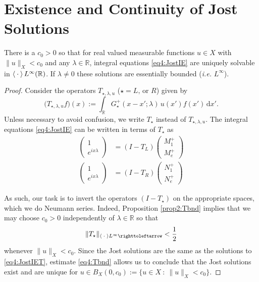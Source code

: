 \documentclass[../dissertation.tex]{subfiles}
\begin{document}
\section{Existence and Continuity of Jost Solutions}\label{sec4:Exist}



\begin{prop}\label{prop4:exist}
	There is a $c_0 > 0$ so that for real valued measurable functions $u \in X$
	with $\| u \|_X < c_0$ and any $\lambda \in \mathbb R$, integral equations 
	\eqref{eq4:JostIE} are uniquely solvable in $\left\langle \kern 0.5ex \cdot \kern 0.5ex \right\rangle L^\infty(\mathbb R)$.
	If $\lambda \ne 0$ these solutions are essentially bounded 
	(\textit{i.e.} $L^\infty$).
\end{prop}
\begin{proof}
	Consider the operators $T_{\star,\lambda, u}$ ($\star = L \text{, or } R$)
	given by
	\[
		\big(T_{\star,\lambda, u} f\big)(x) 
			:= \int_{\mathbb R} G_\star^+(x-x'; \lambda) \, u(x') f(x') \, \mathrm{d}x'.
	\]
	Unless necessary to avoid confusion, we write $T_\star$ instead of 
	$T_{\star,\lambda,u}$. The integral equations \eqref{eq4:JostIE} can be 
	written in terms of $T_\star$ as
	\begin{subequations}
		\label{eq4:JostIET}
		\begin{align}
			\label{eq4:JostIETM}
			\begin{pmatrix}
				1 \\ e^{ix\lambda}
			\end{pmatrix}
			&= 
				(I - T_L) 
				\begin{pmatrix}
					M_1^+ \\
					M_e^+
				\end{pmatrix} \\
			\label{eq4:JostIETN}
			\begin{pmatrix}
				1 \\ e^{ix\lambda}
			\end{pmatrix}
			&= 
				(I - T_R) 
				\begin{pmatrix}
					N_1^+ \\
					N_e^+
				\end{pmatrix}
		\end{align}
	\end{subequations}

	As such, our task is to invert the operators $(I - T_\star)$ on the 
	appropriate spaces, which we do  Neumann series. Indeed, 
	Proposition \ref{prop2:Tbnd} implies that we may choose $c_0>0$ independently 
	of $\lambda \in \mathbb R$ so that 
	\begin{align}\label{eq4:Tbnd}
		\| T_\star \|_{\inn{\dotarg} L^\infty \toitself} < \frac{1}{2}
	\end{align}
	whenever $\| u\|_X < c_0$. Since the Jost solutions are the same as the 
	solutions to \eqref{eq4:JostIET}, estimate \eqref{eq4:Tbnd} allows us to
	conclude that the Jost solutions exist and are unique for 
	$u \in B_X(0, c_0) := \{ u\in X ~:~ \|u\|_X < c_0 \}$.


\end{proof}
\end{document}
